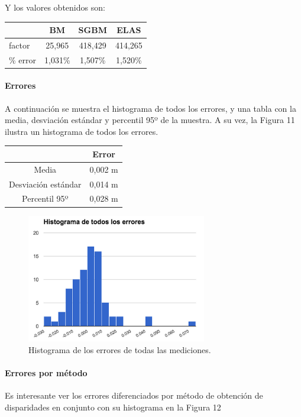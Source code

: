 \documentclass[11pt,a4paper,titlepage]{article}
\newcommand{\Figure}[1]{Figura #1}
\begin{document}
Y los valores obtenidos son:

\begin{tabular}{ | l | c | c | c | }
	\hline  
	& BM & SGBM & ELAS \\
	\hline  
	factor & 25,965 & 418,429 & 414,265 \\
	\hline  
	\% error & 1,031\% & 1,507\% & 1,520\% \\
	\hline  
\end{tabular}

\paragraph{Errores}
\hfill \break
A continuación se muestra el histograma de todos los errores, y una tabla con la media, desviación estándar y percentil 95º de la muestra. A su vez, la \Figure{11} ilustra un histograma de todos los errores.

\begin{tabular}{ | c | c | }
	\hline  
	& Error \\
	\hline  
	Media & 0,002 m \\
	\hline  
	Desviación estándar & 0,014 m \\
	\hline
	Percentil 95º & 0,028 m \\
	\hline    
\end{tabular}

\begin{figure}[h!]

  \centering
    \includegraphics[width=0.7\textwidth]{f11.png}
  \caption{Histograma de los errores de todas las mediciones.}
\end{figure}

\paragraph{Errores por método}
\hfill \break
Es interesante ver los errores diferenciados por método de obtención de disparidades en conjunto con su histograma en la \Figure{12}
\end{document}
